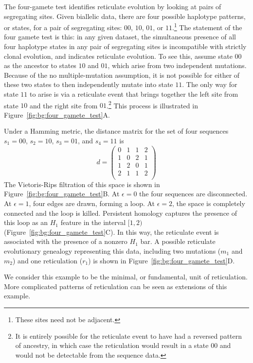 The four-gamete test identifies reticulate evolution by looking at pairs of segregating sites.
Given biallelic data, there are four possible haplotype patterns, or states, for a pair of segregating sites: $00$, $10$, $01$, or $11$.\footnote{These sites need not be adjacent.}
The statement of the four gamete test is this: in any given dataset, the simultaneous presence of all four haplotype states in any pair of segregating sites is incompatible with strictly clonal evolution, and indicates reticulate evolution.
To see this, assume state $00$ as the ancestor to states $10$ and $01$, which arise from two independent mutations.
Because of the no multiple-mutation assumption, it is not possible for either of these two states to then independently mutate into state $11$.
The only way for state $11$ to arise is via a reticulate event that brings together the left site from state $10$ and the right site from $01$.\footnote{It is entirely possible for the reticulate event to have had a reversed pattern of ancestry, in which case the reticulation would result in a state $00$ and would not be detectable from the sequence data.}
This process is illustrated in Figure~\ref{fig:bg:four_gamete_test}A.

Under a Hamming metric, the distance matrix for the set of four sequences $s_1=00$, $s_2=10$, $s_3=01$, and $s_4=11$ is
\begin{equation}
d = 
\begin{pmatrix}
0 & 1 & 1 & 2 \\
1 & 0 & 2 & 1 \\
1 & 2 & 0 & 1 \\
2 & 1 & 1 & 2 \\
\end{pmatrix}
\end{equation}
The Vietoris-Rips filtration of this space is shown in Figure~\ref{fig:bg:four_gamete_test}B.
At $\epsilon=0$ the four sequences are disconnected.
At $\epsilon=1$, four edges are drawn, forming a loop.
At $\epsilon=2$, the space is completely connected and the loop is killed.
Persistent homology captures the presence of this loop as an $H_1$ feature in the interval $[1,2)$ (Figure~\ref{fig:bg:four_gamete_test}C).
In this way, the reticulate event is associated with the presence of a nonzero $H_1$ bar.
A possible reticulate evolutionary genealogy representing this data, including two mutations ($m_1$ and $m_2$) and one reticulation ($r_1$) is shown in Figure~\ref{fig:bg:four_gamete_test}D.

We consider this example to be the minimal, or fundamental, unit of reticulation.
More complicated patterns of reticulation can be seen as extensions of this example.

